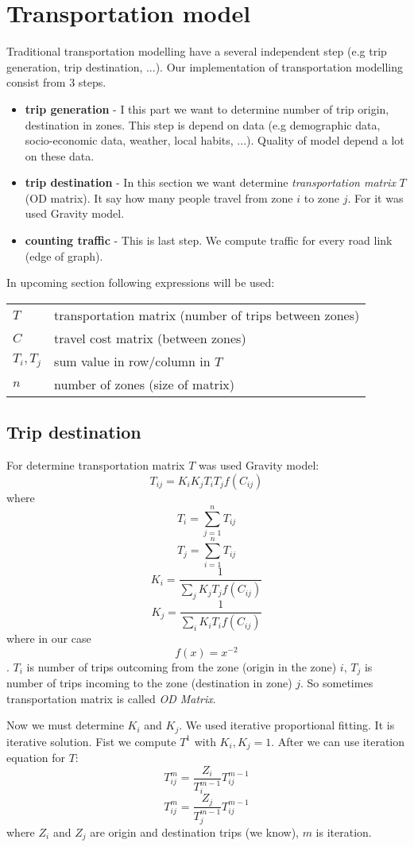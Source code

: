 \section{Transportation model}
Traditional transportation modelling have a several independent step (e.g trip generation, trip destination, ...). Our implementation of transportation modelling consist from 3 steps.
\begin{itemize}
\item[ ] \textbf{trip generation} - I this part we want to determine number of trip origin, destination in zones. This step is depend on data (e.g demographic data, socio-economic data, weather, local habits, ...). Quality of model depend a lot on these data.
\item[ ] \textbf{trip destination} - In this section we want determine \textit{transportation matrix} $T$ (OD matrix). It say how many people travel from zone $i$ to zone $j$. For it was used Gravity model.
\item[ ] \textbf{counting traffic} - This is last step.  We compute traffic for every road link (edge of graph).
\end{itemize}
In upcoming section following expressions will be used:

\begin{tabular}{ll}
$T$ & transportation matrix (number of trips between zones)\\
$C$ & travel cost matrix (between zones) \\
$T_i, T_j$ & sum value in row/column in $T$\\
$n$ & number of zones (size of matrix)
\end{tabular}

\subsection{Trip destination}

For determine transportation matrix $T$ was used Gravity model:
$$T_{ij} = K_i K_j T_i T_j f(C_{ij})$$
where
$$T_i = \sum_{j = 1}^{n} T_{ij}$$
$$T_j = \sum_{i = 1}^{n} T_{ij}$$
$$K_i = \frac{1}{\sum_{j} K_j T_j f(C_{ij})}$$
$$K_j = \frac{1}{\sum_{i} K_i T_i f(C_{ij})}$$
where in our case $$f(x) = x^{-2}$$.
$T_i$ is number of trips outcoming from the zone (origin in the zone) $i$, $T_j$ is number of trips incoming to the zone (destination in zone) $j$. So sometimes transportation matrix is called \textit{OD Matrix}. 

Now we must determine $K_i$ and $K_j$. We used iterative proportional fitting. It is iterative solution. Fist we compute $T^1$ with $K_i, K_j = 1$. After we can use iteration equation for $T$:
$$T_{ij}^{m} = \frac{Z_i}{T_i^{m-1}} T_{ij}^{m-1}$$
$$T_{ij}^{m} = \frac{Z_j}{T_j^{m-1}} T_{ij}^{m-1}$$
where $Z_i$ and $Z_j$ are origin and destination trips (we know), $m$ is iteration.

